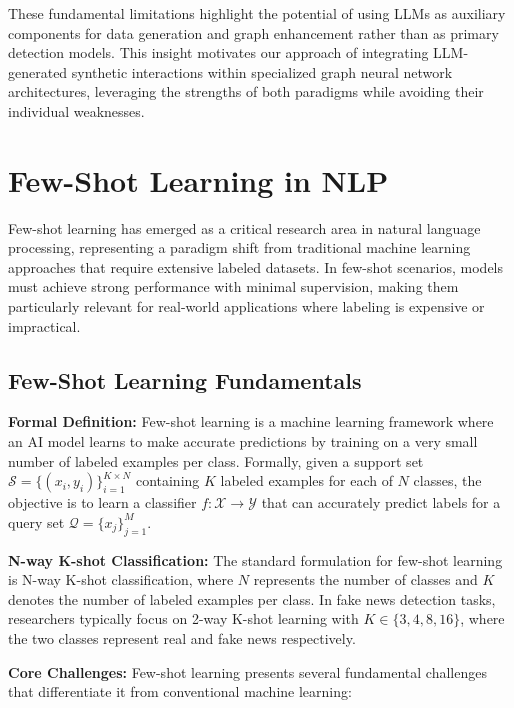These fundamental limitations highlight the potential of using LLMs as auxiliary components for data generation and graph enhancement rather than as primary detection models. This insight motivates our approach of integrating LLM-generated synthetic interactions within specialized graph neural network architectures, leveraging the strengths of both paradigms while avoiding their individual weaknesses.

\section{Few-Shot Learning in NLP}

Few-shot learning has emerged as a critical research area in natural language processing, representing a paradigm shift from traditional machine learning approaches that require extensive labeled datasets. In few-shot scenarios, models must achieve strong performance with minimal supervision, making them particularly relevant for real-world applications where labeling is expensive or impractical.

\subsection{Few-Shot Learning Fundamentals}

\textbf{Formal Definition:} Few-shot learning is a machine learning framework where an AI model learns to make accurate predictions by training on a very small number of labeled examples per class. Formally, given a support set $\mathcal{S} = \{(x_i, y_i)\}_{i=1}^{K \times N}$ containing $K$ labeled examples for each of $N$ classes, the objective is to learn a classifier $f: \mathcal{X} \rightarrow \mathcal{Y}$ that can accurately predict labels for a query set $\mathcal{Q} = \{x_j\}_{j=1}^{M}$.

\textbf{N-way K-shot Classification:} The standard formulation for few-shot learning is N-way K-shot classification, where $N$ represents the number of classes and $K$ denotes the number of labeled examples per class. In fake news detection tasks, researchers typically focus on 2-way K-shot learning with $K \in \{3, 4, 8, 16\}$, where the two classes represent real and fake news respectively.

\textbf{Core Challenges:} Few-shot learning presents several fundamental challenges that differentiate it from conventional machine learning:


